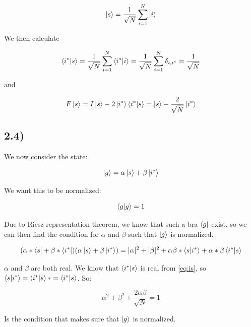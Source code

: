 \documentclass[a4paper,norsk, 10pt]{article}
\begin{document}
\begin{equation}
\ket{s} = \frac{1}{\sqrt{N}} \sum_{i=1}^N \ket{i}
\end{equation}

We then calculate 

\begin{equation}
\braket{i^*}{s} = \frac{1}{\sqrt{N}} \sum_{i=1}^N \braket{i^*}{i} = \frac{1}{\sqrt{N}} \sum_{i=1}^N \delta_{i,i^*} = \frac{1}{\sqrt{N}} 
\end{equation}\label{eq:is}


and

\begin{equation}
F\ket{s} = I\ket{s} - 2\ket{i^*}\bra{i^*}\ket{s} = \ket{s} - \frac{2}{\sqrt{N}}\ket{i^*}
\end{equation}\label{eq:Fs}



\subsection{2.4)}

We now consider the state:

\begin{equation}
\ket{g} = \alpha \ket{s} + \beta\ket{i^*}
\end{equation}

We want this to be normalized:

\begin{equation}
\braket{g}{g} = 1
\end{equation}

Due to Riesz representation theorem, we know that such a bra $\bra{g}$ exist, so we can then find the condition for $\alpha$ and $\beta$ such that $\ket{g}$ is normalized.

\begin{equation}
(\alpha* \bra{s} + \beta*\bra{i^*})(\alpha \ket{s} + \beta\ket{i^*}) = |\alpha|^2 + |\beta|^2 + \alpha\beta* \braket{s}{i^*} + \alpha*\beta \braket{i^*}{s}
\end{equation}

$\alpha$ and $\beta$ are both real. We know that $\braket{i^*}{s}$ is real from \eqref{eq:is}, so $\braket{s}{i^*} = \braket{i^*}{s}* = \braket{i^*}{s}$. So: 

\begin{equation}
\alpha^2 + \beta^2 + \frac{2\alpha \beta}{\sqrt{N}} = 1
\end{equation}\label{eq:conditionAB}

Is the condition that makes sure that $\ket{g}$ is normalized.
\end{document}
